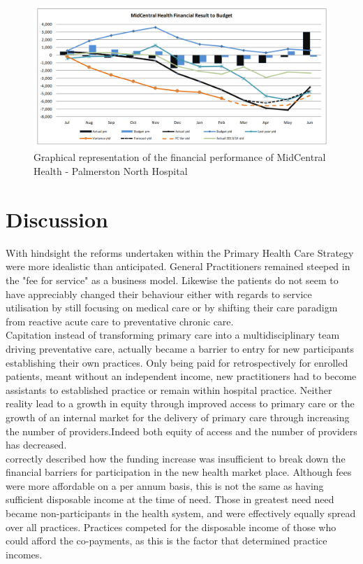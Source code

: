 \documentclass[11pt,a4paper]{article}
\begin{document}
\begin{figure}[htp]
\centering
\includegraphics[scale=0.30]{MCHgraph.png}
\caption{Graphical representation of the financial performance of MidCentral Health - Palmerston North Hospital}
\label{}
\end{figure}

\pagebreak

\section{Discussion}
With hindsight the reforms undertaken within the Primary Health Care Strategy were more idealistic than anticipated. General Practitioners remained steeped in the "fee for service" as a business model. Likewise the patients do not seem to have appreciably changed their behaviour either with regards to service utilisation by still focusing on medical care or by shifting their care paradigm from reactive acute care to preventative chronic care. \\

Capitation instead of transforming primary care into a multidisciplinary team driving preventative care, actually became a barrier to entry for new participants establishing their own practices. Only being paid for retrospectively for enrolled patients, meant without an independent income, new practitioners had to become assistants to established practice or remain within hospital practice. Neither reality lead to a growth in equity through improved access to primary care or the growth of an internal market for the delivery of primary care through increasing the number of providers.Indeed both equity of access and the number of providers has decreased.\\

\citet{cumming2008reforming} correctly described how the funding increase was insufficient to break down the financial barriers for participation in the new health market place. Although fees were more affordable on a per annum basis, this is not the same as having sufficient disposable income at the time of need. Those in greatest need need became non-participants in the health system, and were effectively equally spread over all practices. Practices competed for the disposable income of those who could afford the co-payments, as this is the factor that determined practice incomes.\\
\end{document}
